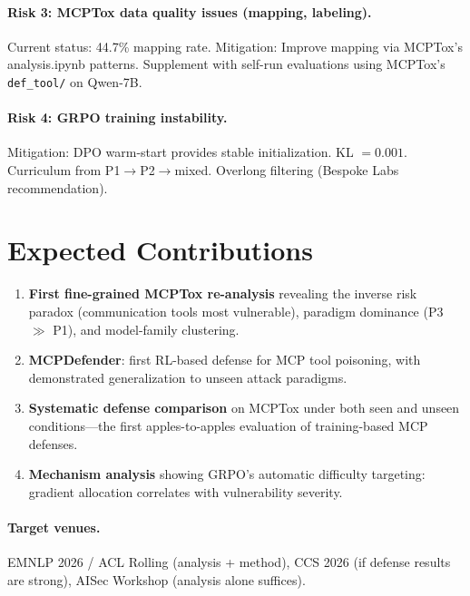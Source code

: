 \documentclass[11pt,a4paper]{article}
\begin{document}
\paragraph{Risk 3: MCPTox data quality issues (mapping, labeling).}
Current status: 44.7\% mapping rate. Mitigation: Improve mapping via MCPTox's analysis.ipynb patterns. Supplement with self-run evaluations using MCPTox's \texttt{def\_tool/} on Qwen-7B.

\paragraph{Risk 4: GRPO training instability.}
Mitigation: DPO warm-start provides stable initialization. KL $=0.001$. Curriculum from P1$\to$P2$\to$mixed. Overlong filtering (Bespoke Labs recommendation).


\section{Expected Contributions}

\begin{enumerate}
    \item \textbf{First fine-grained MCPTox re-analysis} revealing the inverse risk paradox (communication tools most vulnerable), paradigm dominance (P3 $\gg$ P1), and model-family clustering.

    \item \textbf{MCPDefender}: first RL-based defense for MCP tool poisoning, with demonstrated generalization to unseen attack paradigms.

    \item \textbf{Systematic defense comparison} on MCPTox under both seen and unseen conditions---the first apples-to-apples evaluation of training-based MCP defenses.

    \item \textbf{Mechanism analysis} showing GRPO's automatic difficulty targeting: gradient allocation correlates with vulnerability severity.
\end{enumerate}

\paragraph{Target venues.}
EMNLP 2026 / ACL Rolling (analysis + method), CCS 2026 (if defense results are strong), AISec Workshop (analysis alone suffices).
\end{document}
